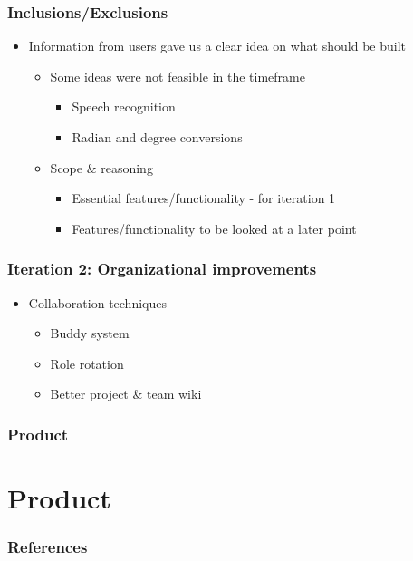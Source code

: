 \documentclass{beamer}
\begin{document}
\begin{frame}
\frametitle{Inclusions/Exclusions}
\begin{itemize}
 \item Information from users gave us a clear idea on what should be built
  \begin{itemize}
  \item Some ideas were not feasible in the timeframe
  \begin{itemize}
    \item Speech recognition
    \item Radian and degree conversions
  \end{itemize}
  \item Scope \& reasoning
    \begin{itemize}
    \item Essential features/functionality - for iteration 1
    \item Features/functionality to be looked at a later point
  \end{itemize}
  \end{itemize}
  \end{itemize}
\end{frame}

\begin{frame}
\frametitle{Iteration 2: Organizational improvements}
\begin{itemize}
 \item Collaboration techniques
  \begin{itemize}
   \item Buddy system
   \item Role rotation
   \item Better project \& team wiki
  \end{itemize}
\end{itemize}
\end{frame}

\begin{frame}
\frametitle{Product}
\end{frame}

\section{Product}
\begin{frame}
\frametitle{References}
\end{frame}
\end{document}
